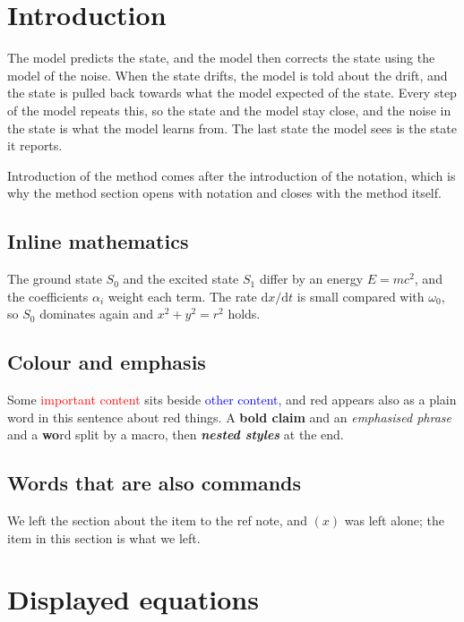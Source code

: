 \documentclass{article}
\begin{document}
\section{Introduction}

The model predicts the state, and the model then corrects the state using the model of the noise. When the state drifts, the model is told about the drift, and the state is pulled back towards what the model expected of the state. Every step of the model repeats this, so the state and the model stay close, and the noise in the state is what the model learns from. The last state the model sees is the state it reports.

Introduction of the method comes after the introduction of the notation, which is why the method section opens with notation and closes with the method itself.

\subsection{Inline mathematics}

The ground state $S_0$ and the excited state $S_1$ differ by an energy $E = mc^2$, and the coefficients $\alpha_i$ weight each term. The rate $\mathrm{d}x/\mathrm{d}t$ is small compared with $\omega_0$, so $S_0$ dominates again and $x^2 + y^2 = r^2$ holds.

\subsection{Colour and emphasis}

Some \textcolor{red}{important content} sits beside \textcolor{blue}{other content}, and red appears also as a plain word in this sentence about red things. A \textbf{bold claim} and an \emph{emphasised phrase} and a \textbf{wo}rd split by a macro, then \textit{\textbf{nested styles}} at the end.

\subsection{Words that are also commands}

We left the section about the item to the ref note, and $\left( x \right)$ was left alone; the item in this section is what we left.

\section{Displayed equations}
\end{document}
